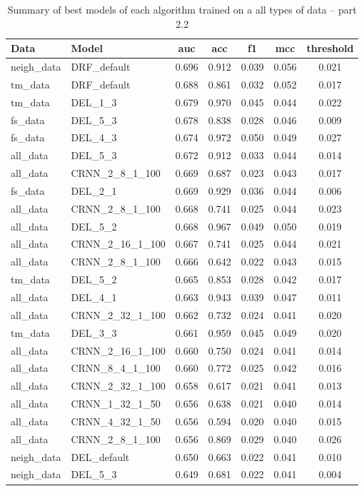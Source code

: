 \documentclass[thesis=M,english]{FITthesis}[2012/10/20]
\begin{document}
\begin{table}[H]\centering
\begin{small}
    \caption{Summary of best models of each algorithm trained on a all types of data -- part 2.2}\label{tab:all_data_summary_2_2}
    \begin{tabular}{|l|l|c|c|c|c|c|}\hline
    Data & Model & \gls{auc} & \gls{acc} & \gls{f1} & \gls{mcc} & threshold \tabularnewline \hline \hline
neigh\_data & DRF\_default & 0.696 & 0.912 & 0.039 & 0.056 & 0.021 \tabularnewline  \hline 
tm\_data & DRF\_default & 0.688 & 0.861 & 0.032 & 0.052 & 0.017 \tabularnewline  \hline 
tm\_data & DEL\_1\_3 & 0.679 & 0.970 & 0.045 & 0.044 & 0.022 \tabularnewline  \hline 
fs\_data & DEL\_5\_3 & 0.678 & 0.838 & 0.028 & 0.046 & 0.009 \tabularnewline  \hline 
fs\_data & DEL\_4\_3 & 0.674 & 0.972 & 0.050 & 0.049 & 0.027 \tabularnewline  \hline 
all\_data & DEL\_5\_3 & 0.672 & 0.912 & 0.033 & 0.044 & 0.014 \tabularnewline  \hline 
all\_data & CRNN\_2\_8\_1\_100 & 0.669 & 0.687 & 0.023 & 0.043 & 0.017 \tabularnewline  \hline 
fs\_data & DEL\_2\_1 & 0.669 & 0.929 & 0.036 & 0.044 & 0.006 \tabularnewline  \hline 
all\_data & CRNN\_2\_8\_1\_100 & 0.668 & 0.741 & 0.025 & 0.044 & 0.023 \tabularnewline  \hline 
all\_data & DEL\_5\_2 & 0.668 & 0.967 & 0.049 & 0.050 & 0.019 \tabularnewline  \hline 
all\_data & CRNN\_2\_16\_1\_100 & 0.667 & 0.741 & 0.025 & 0.044 & 0.021 \tabularnewline  \hline 
all\_data & CRNN\_2\_8\_1\_100 & 0.666 & 0.642 & 0.022 & 0.043 & 0.015 \tabularnewline  \hline 
tm\_data & DEL\_5\_2 & 0.665 & 0.853 & 0.028 & 0.042 & 0.017 \tabularnewline  \hline 
all\_data & DEL\_4\_1 & 0.663 & 0.943 & 0.039 & 0.047 & 0.011 \tabularnewline  \hline 
all\_data & CRNN\_2\_32\_1\_100 & 0.662 & 0.732 & 0.024 & 0.041 & 0.020 \tabularnewline  \hline 
tm\_data & DEL\_3\_3 & 0.661 & 0.959 & 0.045 & 0.049 & 0.020 \tabularnewline  \hline 
all\_data & CRNN\_2\_16\_1\_100 & 0.660 & 0.750 & 0.024 & 0.041 & 0.014 \tabularnewline  \hline 
all\_data & CRNN\_8\_4\_1\_100 & 0.660 & 0.772 & 0.025 & 0.042 & 0.016 \tabularnewline  \hline 
all\_data & CRNN\_2\_32\_1\_100 & 0.658 & 0.617 & 0.021 & 0.041 & 0.013 \tabularnewline  \hline 
all\_data & CRNN\_1\_32\_1\_50 & 0.656 & 0.638 & 0.021 & 0.040 & 0.014 \tabularnewline  \hline 
all\_data & CRNN\_4\_32\_1\_50 & 0.656 & 0.594 & 0.020 & 0.040 & 0.015 \tabularnewline  \hline 
all\_data & CRNN\_2\_8\_1\_100 & 0.656 & 0.869 & 0.029 & 0.040 & 0.026 \tabularnewline  \hline 
neigh\_data & DEL\_default & 0.650 & 0.663 & 0.022 & 0.041 & 0.010 \tabularnewline  \hline 
neigh\_data & DEL\_5\_3 & 0.649 & 0.681 & 0.022 & 0.041 & 0.004 \tabularnewline  \hline 

\end{tabular}
\end{small}
\end{table}
\end{document}
